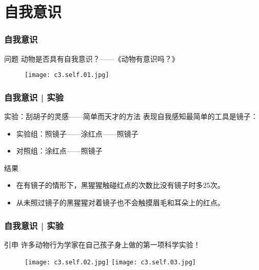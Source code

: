 \section{自我意识}
\begin{frame}
  \frametitle{自我意识}
  \begin{block}{问题}
    动物是否具有自我意识？——《动物有意识吗？》
  \begin{figure}
    \centering
    \texttt{[image: c3.self.01.jpg]}
  \end{figure}
  \end{block}
\end{frame}

\begin{frame}
  \frametitle{自我意识 | 实验}
  \begin{block}{实验：刮胡子的灵感——简单而天才的方法}
表现自我感知最简单的工具是镜子：
    \begin{itemize}
      \item 实验组：照镜子——涂红点——照镜子
      \item 对照组：涂红点——照镜子
    \end{itemize}
  \end{block}
  \pause
  \begin{block}{结果}
    \begin{itemize}
      \item 在有镜子的情形下，黑猩猩触碰红点的次数比没有镜子时多25次。
      \item 从未照过镜子的黑猩猩对着镜子也不会触摸眉毛和耳朵上的红点。
    \end{itemize}
  \end{block}
\end{frame}

\begin{frame}
  \frametitle{自我意识 | 实验}
  \begin{block}{引申}
    许多动物行为学家在自己孩子身上做的第一项科学实验！
    \begin{figure}
      \centering
      \texttt{[image: c3.self.02.jpg]}\quad
      \texttt{[image: c3.self.03.jpg]}
    \end{figure}
  \end{block}
\end{frame}

